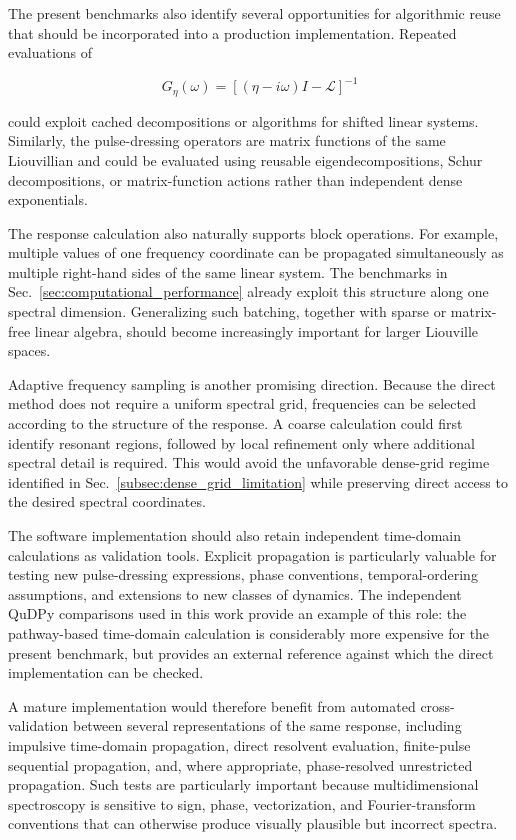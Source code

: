 \documentclass[11pt]{article}
\begin{document}
The present benchmarks also identify several opportunities for
algorithmic reuse that should be incorporated into a production
implementation.  Repeated evaluations of

\begin{equation}
G_\eta(\omega)
=
\left[
(\eta-i\omega)I-\mathcal{L}
\right]^{-1}
\end{equation}

could exploit cached decompositions or algorithms for shifted linear
systems.  Similarly, the pulse-dressing operators are matrix functions
of the same Liouvillian and could be evaluated using reusable
eigendecompositions, Schur decompositions, or matrix-function actions
rather than independent dense exponentials.

The response calculation also naturally supports block operations.
For example, multiple values of one frequency coordinate can be
propagated simultaneously as multiple right-hand sides of the same
linear system.  The benchmarks in Sec.~\ref{sec:computational_performance}
already exploit this structure along one spectral dimension.
Generalizing such batching, together with sparse or matrix-free linear
algebra, should become increasingly important for larger Liouville
spaces.

Adaptive frequency sampling is another promising direction.  Because
the direct method does not require a uniform spectral grid, frequencies
can be selected according to the structure of the response.  A coarse
calculation could first identify resonant regions, followed by local
refinement only where additional spectral detail is required.  This
would avoid the unfavorable dense-grid regime identified in
Sec.~\ref{subsec:dense_grid_limitation} while preserving direct access
to the desired spectral coordinates.

The software implementation should also retain independent
time-domain calculations as validation tools.  Explicit propagation is
particularly valuable for testing new pulse-dressing expressions,
phase conventions, temporal-ordering assumptions, and extensions to
new classes of dynamics.  The independent QuDPy comparisons used in
this work provide an example of this role: the pathway-based
time-domain calculation is considerably more expensive for the present
benchmark, but provides an external reference against which the direct
implementation can be checked.

A mature implementation would therefore benefit from automated
cross-validation between several representations of the same response,
including impulsive time-domain propagation, direct resolvent
evaluation, finite-pulse sequential propagation, and, where
appropriate, phase-resolved unrestricted propagation.  Such tests are
particularly important because multidimensional spectroscopy is
sensitive to sign, phase, vectorization, and Fourier-transform
conventions that can otherwise produce visually plausible but
incorrect spectra.
\end{document}
